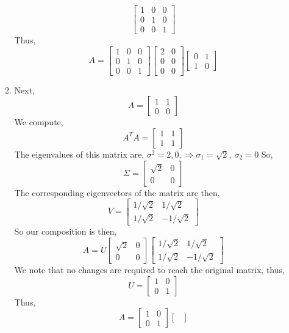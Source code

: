 \documentclass[letterpaper,10pt]{article}
\begin{document}
\begin{enumerate}
\begin{enumerate}
\[\begin{bmatrix}
1 & 0 & 0\\0 & 1 & 0\\0 & 0 & 1
\end{bmatrix} \]
Thus,
\[A=\begin{bmatrix}
1 & 0 & 0\\0 & 1 & 0\\0 & 0 & 1
\end{bmatrix}\begin{bmatrix}
2 & 0\\0 & 0\\0 &0
\end{bmatrix} \begin{bmatrix}
0 & 1\\1 & 0
\end{bmatrix}\]
\item Next,
\[A=\begin{bmatrix}
1 & 1\\ 0 & 0
\end{bmatrix} \]
We compute,
\[A^TA=\begin{bmatrix}
1 & 1\\1 & 1
\end{bmatrix}\]
The eigenvalues of this matrix are, $\sigma^2=2,0, \Rightarrow \sigma_1=\sqrt{2},\ \sigma_2=0$
So,
\[\Sigma=\begin{bmatrix}
\sqrt{2} & 0\\0 & 0
\end{bmatrix} \]
The corresponding eigenvectors of the matrix are then,
\[V=\begin{bmatrix}
1/\sqrt{2} & 1/\sqrt{2}\\1/\sqrt{2} & -1/\sqrt{2}
\end{bmatrix} \]
So our composition is then,
\[A=U\begin{bmatrix}
\sqrt{2} & 0\\0 & 0
\end{bmatrix} \begin{bmatrix}
1/\sqrt{2} & 1/\sqrt{2}\\1/\sqrt{2} & -1/\sqrt{2}
\end{bmatrix}\]
We note that no changes are required to reach the original matrix, thus,
\[U=\begin{bmatrix}
1 & 0\\0 & 1
\end{bmatrix} \]
Thus,
\[A=\begin{bmatrix}
1 & 0\\0 & 1
\end{bmatrix}\begin{bmatrix}

\end{bmatrix}\]
\end{enumerate}
\end{enumerate}
\end{document}
